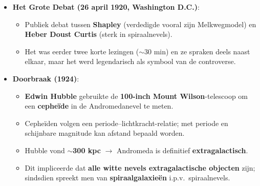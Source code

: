 \documentclass[10pt,a4paper]{article}
\begin{document}
\begin{itemize}
\begin{itemize}
    \item Deze snelheden zijn veel groter dan bij Melkwegsterren, wat het idee dat ze samen één dynamische entiteit vormen onwaarschijnlijk maakt.
    \item \textbf{1915}: Slipher vond voor \textbf{M104} aanwijzingen voor rotatie met $\sim$\textbf{300 km s$^{-1}$} $\rightarrow$ impliceert enorme massa en dus extragalactische schaal; ook in andere galaxieën (zoals \textbf{M31}) werd ondubbelzinnig rotatie vastgesteld.
    \item Men kon niet verklaren waarom nevels systematisch van de Melkweg weg bewegen; een mogelijke verklaring leek een repulsieve kracht vanuit de Melkweg (wat net weer een connectie impliceerde). De ware betekenis (\textbf{kosmische expansie}) werd volgens de tekst pas \textbf{tien jaar later} blootgelegd.
  \end{itemize}
  \item \textbf{Het Grote Debat (26 april 1920, Washington D.C.)}:
  \begin{itemize}
    \item Publiek debat tussen \textbf{Shapley} (verdedigde vooral zijn Melkwegmodel) en \textbf{Heber Doust Curtis} (sterk in spiraalnevels).
    \item Het was eerder twee korte lezingen ($\sim$30 min) en ze spraken deels naast elkaar, maar het werd legendarisch als symbool van de controverse.
  \end{itemize}
  \item \textbf{Doorbraak (1924)}:
  \begin{itemize}
    \item \textbf{Edwin Hubble} gebruikte de \textbf{100-inch Mount Wilson}-telescoop om een \textbf{cepheïde} in de Andromedanevel te meten.
    \item Cepheïden volgen een periode--lichtkracht-relatie; met periode en schijnbare magnitude kan afstand bepaald worden.
    \item Hubble vond $\sim$\textbf{300 kpc} $\rightarrow$ Andromeda is definitief \textbf{extragalactisch}.
    \item Dit impliceerde dat \textbf{alle witte nevels extragalactische objecten} zijn; sindsdien spreekt men van \textbf{spiraalgalaxieën} i.p.v.\ spiraalnevels.
  \end{itemize}
\end{itemize}
\end{document}
